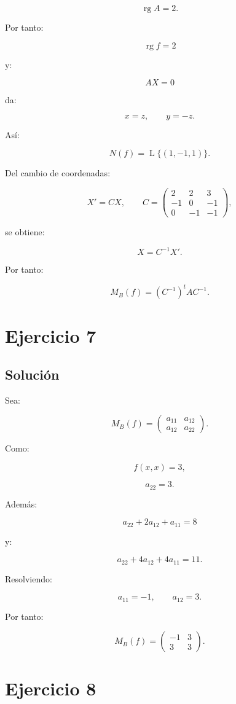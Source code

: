 \documentclass[11pt,a4paper]{article}
\newcommand{\rg}{\operatorname{rg}}
\newcommand{\Span}{\operatorname{L}}
\begin{document}
\[
\rg A=2.
\]

Por tanto:

\[
\boxed{\rg f=2}
\]

y:

\[
AX=0
\]

da:

\[
x=z,\qquad y=-z.
\]

Así:

\[
\boxed{
N(f)=\Span\{(1,-1,1)\}.
}
\]

Del cambio de coordenadas:

\[
X'=CX,
\qquad
C=
\begin{pmatrix}
2&2&3\\
-1&0&-1\\
0&-1&-1
\end{pmatrix},
\]

se obtiene:

\[
X=C^{-1}X'.
\]

Por tanto:

\[
\boxed{
M_B(f)
=
(C^{-1})^tAC^{-1}.
}
\]

\section{Ejercicio 7}
\subsection{Solución}

Sea:

\[
M_B(f)=
\begin{pmatrix}
a_{11}&a_{12}\\
a_{12}&a_{22}
\end{pmatrix}.
\]

Como:

\[
f(x,x)=3,
\]

\[
a_{22}=3.
\]

Además:

\[
a_{22}+2a_{12}+a_{11}=8
\]

y:

\[
a_{22}+4a_{12}+4a_{11}=11.
\]

Resolviendo:

\[
a_{11}=-1,
\qquad
a_{12}=3.
\]

Por tanto:

\[
\boxed{
M_B(f)=
\begin{pmatrix}
-1&3\\
3&3
\end{pmatrix}.
}
\]

\section{Ejercicio 8}
\end{document}
